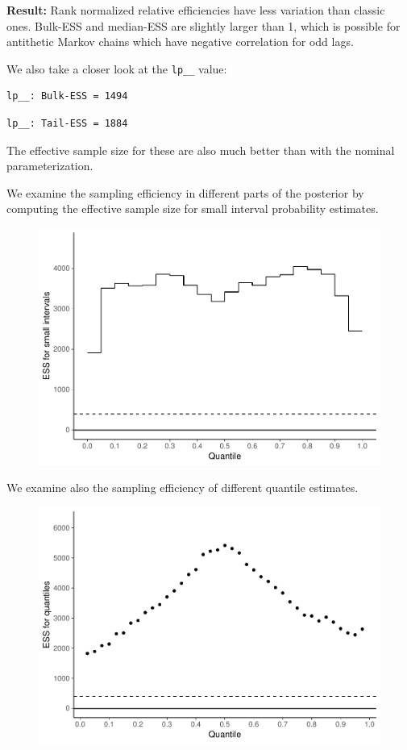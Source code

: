 \documentclass[american,]{article}
\begin{document}
\textbf{Result:} Rank normalized relative efficiencies have less
variation than classic ones. Bulk-ESS and median-ESS are slightly larger
than 1, which is possible for antithetic Markov chains which have
negative correlation for odd lags.

We also take a closer look at the \texttt{lp\_\_} value:

\begin{verbatim}
lp__: Bulk-ESS = 1494
\end{verbatim}

\begin{verbatim}
lp__: Tail-ESS = 1884
\end{verbatim}

The effective sample size for these are also much better than with the
nominal parameterization.

We examine the sampling efficiency in different parts of the posterior
by computing the effective sample size for small interval probability
estimates.

\begin{figure}[tp]
  \centering
  \includegraphics[width=0.6\linewidth]{graphics/local-ess-fit-alt3-1.pdf}
\end{figure}

We examine also the sampling efficiency of different quantile estimates.

\begin{figure}[tp]
  \centering
  \includegraphics[width=0.6\linewidth]{graphics/quantile-ess-fit-alt3-1.pdf}
\end{figure}
\end{document}
